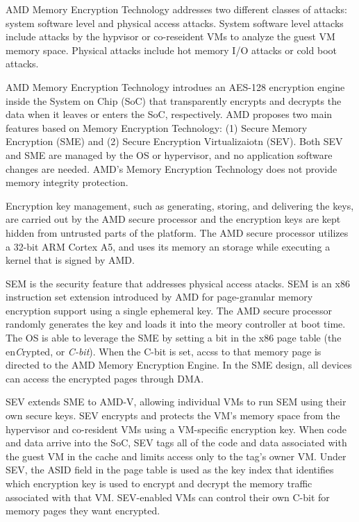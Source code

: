 %
AMD Memory Encryption Technology addresses two different classes of attacks:
system software level and physical access attacks.  
%
System software level attacks include attacks by the hypvisor or co-reseident
VMs to analyze the guest VM memory space.
%
Physical attacks include hot memory I/O attacks or cold boot attacks.


AMD Memory Encryption Technology introdues an AES-128 encryption engine inside
the System on Chip (SoC) that transparently encrypts and decrypts the data
when it leaves or enters the SoC, respectively.
%
AMD proposes two main features based on Memory Encryption Technology: (1)
Secure Memory Encryption (SME) and (2) Secure Encryption Virtualizaiotn (SEV)\@.
%
Both SEV and SME are managed by the OS or hypervisor, and no application software
changes are needed.
%
AMD's Memory Encryption Technology does not provide memory integrity
protection.


Encryption key management, such as generating, storing, and delivering the
keys, are carried out by the AMD secure processor and the encryption keys are kept
hidden from untrusted parts of the platform.
%
The AMD secure processor utilizes a 32-bit ARM Cortex A5, and uses its memory
an storage while executing a kernel that is signed by AMD\@.


SEM is the security feature that addresses physical access atacks.
%
SEM is an x86 instruction set extension introduced by AMD for page-granular
memory encryption support using a single ephemeral key.
%
The AMD secure processor randomly generates the key
and loads it into the meory controller at boot time.
%
The OS is able to leverage the SME by setting a bit in the x86 page table (the
en\emph{C}rypted, or \emph{C-bit}).
%
When the C-bit is set, accss to that memory page is directed to the AMD Memory
Encryption Engine.
%
In the SME design, all devices can access the encrypted pages through DMA\@.




SEV extends SME to AMD-V, allowing individual VMs to run SEM using their own
secure keys.
%
SEV encrypts and protects the VM's memory space from the hypervisor and
co-resident VMs using a VM-specific encryption key.
%
When code and data arrive into the SoC, SEV tags all of the code and data
associated with the guest VM in the cache and limits access only to the tag's
owner VM.
%
Under SEV, the ASID field in the page table is used as the key index that
identifies which encryption key is used to encrypt and decrypt the memory
traffic associated with that VM.
%
SEV-enabled VMs can control their own C-bit for memory pages they want
encrypted.


